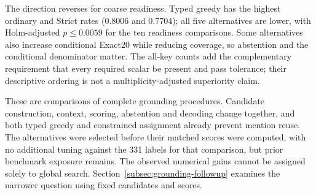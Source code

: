 \documentclass[pdflatex,iicol,sn-basic,Numbered]{sn-jnl}
\begin{document}
The direction reverses for coarse readiness. Typed greedy has the highest ordinary and Strict rates ($0.8006$ and $0.7704$); all five alternatives are lower, with Holm-adjusted $p\leq0.0059$ for the ten readiness comparisons. Some alternatives also increase conditional Exact20 while reducing coverage, so abstention and the conditional denominator matter. The all-key counts add the complementary requirement that every required scalar be present and pass tolerance; their descriptive ordering is not a multiplicity-adjusted superiority claim.

These are comparisons of complete grounding procedures. Candidate construction, context, scoring, abstention and decoding change together, and both typed greedy and constrained assignment already prevent mention reuse. The alternatives were selected before their matched scores were computed, with no additional tuning against the 331 labels for that comparison, but prior benchmark exposure remains. The observed numerical gains cannot be assigned solely to global search. Section~\ref{subsec:grounding-followup} examines the narrower question using fixed candidates and scores.
\end{document}
